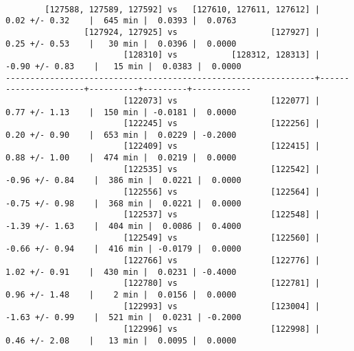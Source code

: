 \documentclass[landscape]{article}
\newenvironment{slide}{\mbox{ }\vfill}{\vfill \mbox{ } \pagebreak}
\begin{document}
\begin{slide}
\begin{verbatim}
        [127588, 127589, 127592] vs   [127610, 127611, 127612] |     0.02 +/- 0.32    |  645 min |  0.0393 |  0.0763
                [127924, 127925] vs                   [127927] |     0.25 +/- 0.53    |   30 min |  0.0396 |  0.0000
                        [128310] vs           [128312, 128313] |    -0.90 +/- 0.83    |   15 min |  0.0383 |  0.0000
---------------------------------------------------------------+----------------------+----------+---------+------------
                        [122073] vs                   [122077] |     0.77 +/- 1.13    |  150 min | -0.0181 |  0.0000
                        [122245] vs                   [122256] |     0.20 +/- 0.90    |  653 min |  0.0229 | -0.2000
                        [122409] vs                   [122415] |     0.88 +/- 1.00    |  474 min |  0.0219 |  0.0000
                        [122535] vs                   [122542] |    -0.96 +/- 0.84    |  386 min |  0.0221 |  0.0000
                        [122556] vs                   [122564] |    -0.75 +/- 0.98    |  368 min |  0.0221 |  0.0000
                        [122537] vs                   [122548] |    -1.39 +/- 1.63    |  404 min |  0.0086 |  0.4000
                        [122549] vs                   [122560] |    -0.66 +/- 0.94    |  416 min | -0.0179 |  0.0000
                        [122766] vs                   [122776] |     1.02 +/- 0.91    |  430 min |  0.0231 | -0.4000
                        [122780] vs                   [122781] |     0.96 +/- 1.48    |    2 min |  0.0156 |  0.0000
                        [122993] vs                   [123004] |    -1.63 +/- 0.99    |  521 min |  0.0231 | -0.2000
                        [122996] vs                   [122998] |     0.46 +/- 2.08    |   13 min |  0.0095 |  0.0000
\end{verbatim}
\end{slide}
\pagebreak
\end{document}
